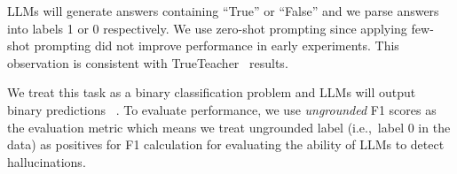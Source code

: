 LLMs will generate answers containing ``True'' or ``False'' and we parse answers into labels 1 or 0 respectively. We use zero-shot prompting since applying few-shot prompting did not improve performance in early experiments. This observation is consistent with TrueTeacher~\cite{Gekhman2023TrueTeacherLF} results.

We treat this task as a binary classification problem and LLMs will output binary predictions ~. To evaluate performance, we use \textit{ungrounded} F1 scores as the evaluation metric which means we treat ungrounded label (i.e.,~label 0 in the data) as positives for F1 calculation for evaluating the ability of LLMs to detect hallucinations.




